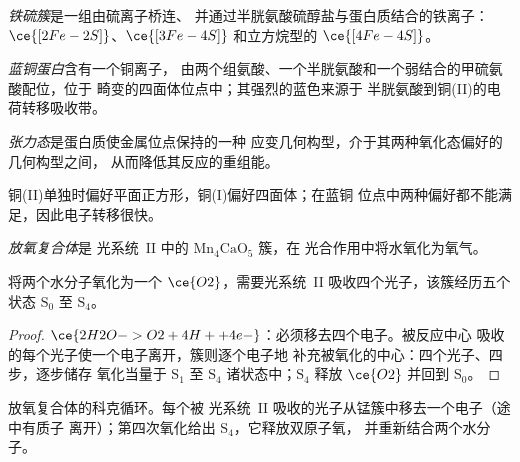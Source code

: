 \begin{definition}[铁硫簇]\label{def:b3:bioinorganic:fes}
\emph{铁硫簇}是一组由硫离子桥连、
并通过半胱氨酸硫醇盐与蛋白质结合的铁离子：
$\ce{[2Fe-2S]}$、$\ce{[3Fe-4S]}$ 和立方烷型的 $\ce{[4Fe-4S]}$。
\end{definition}

\begin{definition}[蓝铜蛋白]\label{def:b3:bioinorganic:blue-copper}
\emph{蓝铜蛋白}含有一个铜离子，
由两个组氨酸、一个半胱氨酸和一个弱结合的甲硫氨酸配位，位于
畸变的四面体位点中；其强烈的蓝色来源于
半胱氨酸到铜(II)的电荷转移吸收带。
\end{definition}

\begin{definition}[张力态]\label{def:b3:bioinorganic:entatic}
\emph{张力态}是蛋白质使金属位点保持的一种
应变几何构型，介于其两种氧化态偏好的几何构型之间，
从而降低其反应的重组能。
\end{definition}

铜(II)单独时偏好平面正方形，铜(I)偏好四面体；在蓝铜
位点中两种偏好都不能满足，因此电子转移很快。

\begin{definition}[放氧复合体]\label{def:b3:bioinorganic:oec}
\emph{放氧复合体}是
光系统~II 中的 $\mathrm{Mn_4CaO_5}$ 簇，在
光合作用中将水氧化为氧气。
\end{definition}

\begin{proposition}[每个氧需四个光子]\label{prop:b3:bioinorganic:kok}
将两个水分子氧化为一个 $\ce{O2}$，需要光系统~II
吸收四个光子，该簇经历五个状态 $\mathrm S_0$ 至 $\mathrm S_4$。
\end{proposition}

\begin{proof}
$\ce{2H2O -> O2 + 4H+ + 4e-}$：必须移去四个电子。被反应中心
吸收的每个光子使一个电子离开，簇则逐个电子地
补充被氧化的中心：四个光子、四步，逐步储存
氧化当量于 $\mathrm S_1$ 至 $\mathrm S_4$ 诸状态中；$\mathrm S_4$ 释放 $\ce{O2}$ 并回到 $\mathrm S_0$。
\end{proof}

\begin{omfigure}

{\small 放氧复合体的科克循环。每个被
光系统~II 吸收的光子从锰簇中移去一个电子（途中有质子
离开）；第四次氧化给出 $\mathrm S_4$，它释放双原子氧，
并重新结合两个水分子。}
\end{omfigure}

